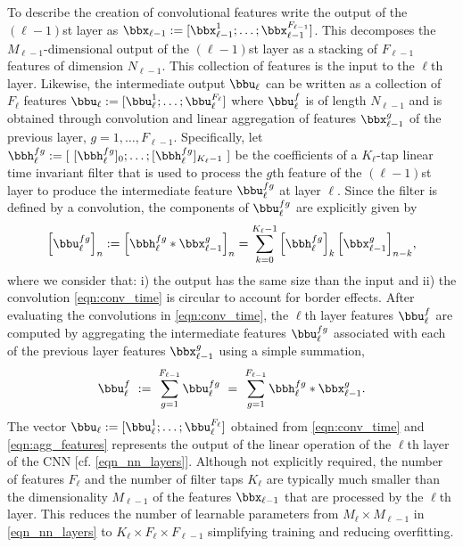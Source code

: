 To describe the creation of convolutional features write the output of the $(\ell-1)$st layer as $\bbx_{\ell-1} := [\bbx^{1}_{\ell-1}; \ldots; \bbx^{F_{\ell-1}}_{\ell-1}]$. This decomposes the $M_{\ell-1}$-dimensional output of the $(\ell-1)$st layer as a stacking of $F_{\ell-1}$ features of dimension $N_{\ell-1}$. This collection of features is the input to the $\ell$th layer. Likewise, the intermediate output $\bbu_{\ell}$ can be written as a collection of $F_{\ell}$ features $\bbu_\ell := [\bbu^{1}_{\ell}; \ldots; \bbu^{F_\ell}_{\ell}] $ where $\bbu^{f}_\ell$ is of length $N_{\ell-1}$ and is obtained through convolution and linear aggregation of features $\bbx^{g}_{\ell-1}$ of the previous layer, $g=1,\ldots,F_{\ell-1}$. Specifically, let $\bbh_{\ell}^{fg} := [\ [\bbh_{\ell}^{fg}]_{0}; \ldots; [\bbh_{\ell}^{fg}]_{K_{\ell}-1} \ ]$ be the coefficients of a $K_\ell$-tap linear time invariant filter that is used to process the $g$th feature of the $(\ell-1)$st layer to produce the intermediate feature $\bbu_{\ell}^{fg}$ at layer $\ell$. Since the filter is defined by a convolution, the components of $\bbu_{\ell}^{fg}$ are explicitly given by
% 
\begin{align}\label{eqn:conv_time}
   \Big[\bbu_{\ell}^{fg}\Big]_n 
       :=   \Big[\bbh_{\ell}^{fg} \ast \bbx_{\ell-1}^{g}\Big]_{n}  
	    =   \sum_{k=0}^{K_{\ell}-1}  \Big[ \bbh_{\ell}^{fg}  \Big]_{k}  \,
	        \Big[ \bbx_{\ell-1}^{g} \Big]_{n-k} ,
\end{align}
%
where we consider that: i) the output has the same size than the input and ii) the convolution \eqref{eqn:conv_time} is circular to account for border effects. After evaluating the convolutions in \eqref{eqn:conv_time}, the $\ell$th layer features $\bbu_{\ell}^{f}$ are computed by aggregating the intermediate features $\bbu_{\ell}^{fg}$ associated with each of the previous layer features $\bbx_{\ell-1}^{g}$ using a simple summation, 
%
\begin{equation} \label{eqn:agg_features}
   \bbu_{\ell}^{f}
       \ :=\ \sum_{g=1}^{F_{\ell-1}} \bbu_{\ell}^{fg}
	   \  =\ \sum_{g=1}^{F_{\ell-1}} \bbh_{\ell}^{fg} \ast \bbx_{\ell-1}^{g} .
\end{equation}
%
The vector $\bbu_\ell := [\bbu^{1}_{\ell}; \ldots; \bbu^{F_\ell}_{\ell}]$ obtained from \eqref{eqn:conv_time} and \eqref{eqn:agg_features} represents the output of the linear operation of the $\ell$th layer of the CNN [cf. \eqref{eqn_nn_layers}]. Although not explicitly required, the number of features $F_{\ell}$ and the number of filter taps $K_{\ell}$ are typically much smaller than the dimensionality $M_{\ell-1}$ of the features $\bbx_{\ell-1}$ that are processed by the $\ell$th layer. This reduces the number of learnable parameters from $M_{\ell}\times M_{\ell-1}$ in \eqref{eqn_nn_layers} to $K_{\ell}\times F_{\ell}\times F_{\ell-1}$ simplifying training and reducing overfitting. 

